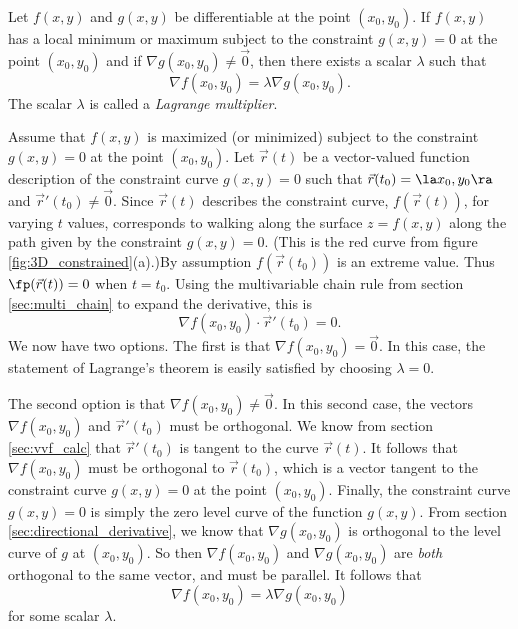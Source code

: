 
{Let $f(x,y)$ and $g(x,y)$ be differentiable at the point $(x_0,y_0)$.  If $f(x,y)$ has a local minimum or maximum subject to the constraint $g(x,y)=0$ at the point $(x_0,y_0)$ and if $\nabla g(x_0,y_0) \neq \vec{0}$, then there exists a scalar $\lambda$ such that
	\[
		\nabla f(x_0,y_0) = \lambda \nabla g(x_0,y_0).
	\]
The scalar $\lambda$ is called a \emph{Lagrange multiplier}. 
}

{Assume that $f(x,y)$ is maximized (or minimized) subject to the constraint $g(x,y)=0$ at the point $(x_0,y_0)$.  Let $\vec{r}(t)$ be a vector-valued function description of the constraint curve $g(x,y)=0$ such that $\vec{r}(t_0)=\la x_0,y_0 \ra$ and $\vec{r}'(t_0) \neq \vec{0}.$  Since $\vec{r}(t)$ describes the constraint curve, $f(\vec{r}(t))$, for varying $t$ values, corresponds to walking along the surface $z=f(x,y)$ along the path given by the constraint $g(x,y)=0$. (This is the red curve from figure \ref{fig:3D_constrained}(a).)By assumption $f(\vec{r}(t_0))$ is an extreme value.  Thus $\fp(\vec{r}(t)) = 0$ when $t = t_0$.  Using the multivariable chain rule from section \ref{sec:multi_chain} to expand the derivative, this is
	\[
		\nabla f(x_0,y_0) \cdot \vec{r}'(t_0)=0.
	\]
We now have two options. The first is that $\nabla f(x_0,y_0) = \vec{0}.$  In this case, the statement of Lagrange's theorem is easily satisfied by choosing $\lambda = 0.$

The second option is that $\nabla f(x_0,y_0) \neq \vec{0}.$ In this second case, the vectors $\nabla f(x_0,y_0)$ and $\vec{r}'(t_0)$ must be orthogonal.  We know from section \ref{sec:vvf_calc} that $\vec{r}'(t_0)$ is tangent to the curve $\vec{r}(t)$.  It follows that $\nabla f(x_0,y_0)$ must be orthogonal to $\vec{r}(t_0)$, which is a vector tangent to the constraint curve $g(x,y)=0$ at the point $(x_0,y_0)$. Finally, the constraint curve $g(x,y)=0$ is simply the zero level curve of the function $g(x,y)$.  From section \ref{sec:directional_derivative}, we know that $\nabla g(x_0,y_0)$ is orthogonal to the level curve of $g$ at $(x_0,y_0)$. So then $\nabla f(x_0,y_0)$ and $\nabla g(x_0,y_0)$ are \emph{both} orthogonal to the same vector, and must be parallel.  It follows that
	\[
		\nabla f(x_0,y_0) = \lambda \nabla g(x_0,y_0)
	\] 
for some scalar $\lambda$.
}

